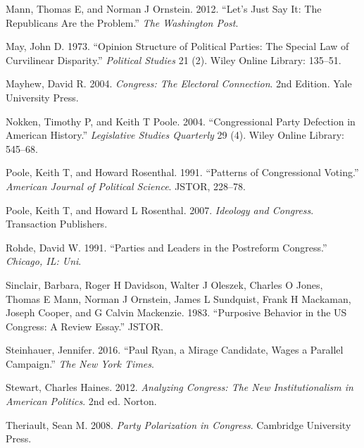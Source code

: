 \documentclass[12pt,twoside]{reedthesis}
\begin{document}
  Mann, Thomas E, and Norman J Ornstein. 2012. ``Let's Just Say It: The
  Republicans Are the Problem.'' \emph{The Washington Post}.
  
  May, John D. 1973. ``Opinion Structure of Political Parties: The Special
  Law of Curvilinear Disparity.'' \emph{Political Studies} 21 (2). Wiley
  Online Library: 135--51.
  
  Mayhew, David R. 2004. \emph{Congress: The Electoral Connection}. 2nd
  Edition. Yale University Press.
  
  Nokken, Timothy P, and Keith T Poole. 2004. ``Congressional Party
  Defection in American History.'' \emph{Legislative Studies Quarterly} 29
  (4). Wiley Online Library: 545--68.
  
  Poole, Keith T, and Howard Rosenthal. 1991. ``Patterns of Congressional
  Voting.'' \emph{American Journal of Political Science}. JSTOR, 228--78.
  
  Poole, Keith T, and Howard L Rosenthal. 2007. \emph{Ideology and
  Congress}. Transaction Publishers.
  
  Rohde, David W. 1991. ``Parties and Leaders in the Postreform
  Congress.'' \emph{Chicago, IL: Uni}.
  
  Sinclair, Barbara, Roger H Davidson, Walter J Oleszek, Charles O Jones,
  Thomas E Mann, Norman J Ornstein, James L Sundquist, Frank H Mackaman,
  Joseph Cooper, and G Calvin Mackenzie. 1983. ``Purposive Behavior in the
  US Congress: A Review Essay.'' JSTOR.
  
  Steinhauer, Jennifer. 2016. ``Paul Ryan, a Mirage Candidate, Wages a
  Parallel Campaign.'' \emph{The New York Times}.
  
  Stewart, Charles Haines. 2012. \emph{Analyzing Congress: The New
  Institutionalism in American Politics}. 2nd ed. Norton.
  
  Theriault, Sean M. 2008. \emph{Party Polarization in Congress}.
  Cambridge University Press.


\end{document}
